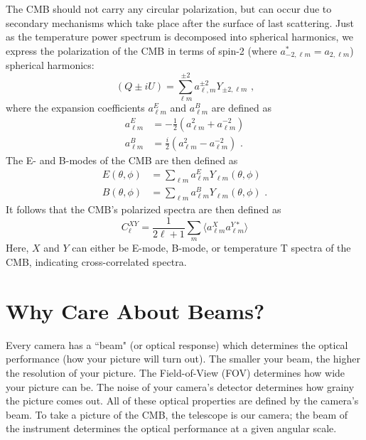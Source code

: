 The CMB should not carry any circular polarization, but can occur due to secondary mechanisms which take place after the surface of last scattering.  Just as the temperature power spectrum is decomposed into spherical harmonics, we express the polarization of the CMB in terms of spin-2 (where $a^*_{-2,\ell m} = a_{2,\ell m}$) spherical harmonics:
\begin{equation}
(Q \pm iU) = \sum_{\ell m}^{\pm 2} a^{\pm 2}_{\ell ,m} Y_{\pm2,\ell m} \text{ ,}
\end{equation}
where the expansion coefficients $a_{\ell m }^E$ and $a_{\ell m }^B$ are defined as
\begin{equation}
\begin{split}
    a_{\ell m }^E & = -\frac{1}{2}(a_{\ell m}^2 + a_{\ell m}^{-2}) \\
    a_{\ell m }^B & = \frac{i}{2}(a_{\ell m}^2 - a_{\ell m}^{-2}) \text{ .}
\end{split}
\end{equation}
The E- and B-modes of the CMB are then defined as
\begin{equation}
\begin{split}
    E(\theta,\phi) & = \sum_{\ell m} a_{\ell m }^E Y_{\ell m}(\theta,\phi) \\
    B(\theta,\phi) & = \sum_{\ell m} a_{\ell m }^B Y_{\ell m}(\theta,\phi) \text{ .}
\end{split}
\end{equation}
It follows that the CMB's polarized spectra are then defined as
\begin{equation}
    C_{\ell}^{XY} = \frac{1}{2\ell+1}\sum_m \langle a_{\ell m}^{X} a_{\ell m}^{Y*} \rangle 
\end{equation}
Here, $X$ and $Y$ can either be E-mode, B-mode, or temperature T spectra of the CMB, indicating cross-correlated spectra.

\section{Why Care About Beams?}
Every camera has a ``beam" (or optical response) which determines the optical performance (how your picture will turn out).  The smaller your beam, the higher the resolution of your picture.   The Field-of-View (FOV) determines how wide your picture can be.  The noise of your camera's detector determines how grainy the picture comes out.  All of these optical properties are defined by the camera's beam.  To take a picture of the CMB, the telescope is our camera; the beam of the instrument determines the optical performance at a given angular scale.  

